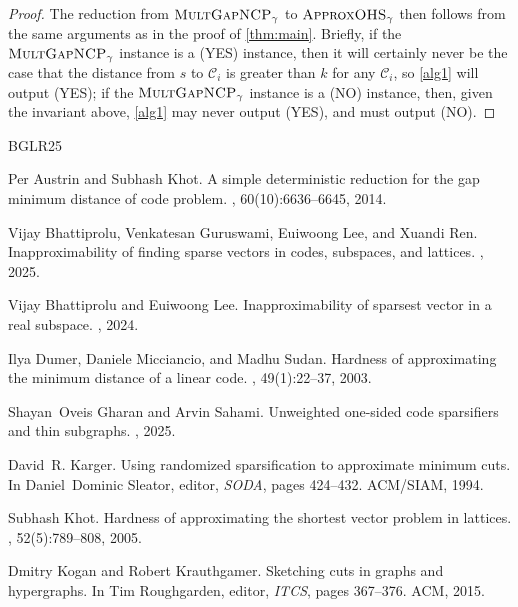 \documentclass{article}
\newcommand{\MultGapNCP}{\textsc{Mult\-Gap\-NCP}}
\newcommand{\ApproxOHS}{\textsc{Approx\-OHS}}
\newcommand{\calC}{\mathcal{C}}
\begin{document}
\begin{proof}
The reduction from {$\MultGapNCP_\gamma$} to {$\ApproxOHS_\gamma$} then follows from the same arguments as in the proof of \cref{thm:main}. Briefly, if the {$\MultGapNCP_\gamma$} instance is a (YES) instance, then it will certainly never be the case that the distance from $s$ to $\calC_i$ is greater than $k$ for any $\calC_i$, so \autoref{alg1} will output (YES); if the {$\MultGapNCP_\gamma$} instance is a (NO) instance, then, given the invariant above, \autoref{alg1} may never output (YES), and must output (NO).
\end{proof}

\begin{thebibliography}{BGLR25}

Per Austrin and Subhash Khot.
\newblock A simple deterministic reduction for the gap minimum distance of code
  problem.
, 60(10):6636--6645,
  2014.

Vijay Bhattiprolu, Venkatesan Guruswami, Euiwoong Lee, and Xuandi Ren.
\newblock Inapproximability of finding sparse vectors in codes, subspaces, and
  lattices.
, 2025.

Vijay Bhattiprolu and Euiwoong Lee.
\newblock Inapproximability of sparsest vector in a real subspace.
, 2024.

Ilya Dumer, Daniele Micciancio, and Madhu Sudan.
\newblock Hardness of approximating the minimum distance of a linear code.
, 49(1):22--37, 2003.

Shayan~Oveis Gharan and Arvin Sahami.
\newblock Unweighted one-sided code sparsifiers and thin subgraphs.
, 2025.

David~R. Karger.
\newblock Using randomized sparsification to approximate minimum cuts.
\newblock In Daniel~Dominic Sleator, editor, {\em SODA}, pages 424--432.
  {ACM/SIAM}, 1994.

Subhash Khot.
\newblock Hardness of approximating the shortest vector problem in lattices.
, 52(5):789--808, 2005.

Dmitry Kogan and Robert Krauthgamer.
\newblock Sketching cuts in graphs and hypergraphs.
\newblock In Tim Roughgarden, editor, {\em ITCS}, pages 367--376. {ACM}, 2015.


\end{thebibliography}
\end{document}
